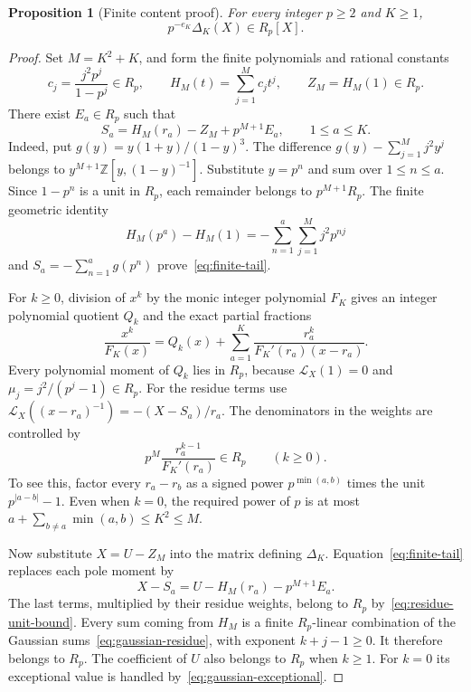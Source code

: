 \documentclass[11pt,letterpaper]{article}
\numberwithin{equation}{section}
\newtheorem{proposition}[theorem]{Proposition}
\theoremstyle{remark}
\newcommand{\Z}{\mathbb Z}
\newcommand{\Lcal}{\mathcal L}
\begin{document}
\begin{proposition}[Finite content proof]\label{prop:elementary-content}
For every integer $p\ge2$ and $K\ge1$,
\begin{equation*}
 p^{-e_K}\Delta_K(X)\in R_p[X].
\end{equation*}
\end{proposition}
\begin{proof}
Set $M=K^2+K$, and form the finite polynomials and rational constants
\begin{equation*}
 c_j=\frac{j^2p^j}{1-p^j}\in R_p,\qquad
 H_M(t)=\sum_{j=1}^{M}c_jt^j,\qquad Z_M=H_M(1)\in R_p.
\end{equation*}
There exist $E_a\in R_p$ such that
\begin{equation}\label{eq:finite-tail}
 S_a=H_M(r_a)-Z_M+p^{M+1}E_a,\qquad 1\le a\le K.
\end{equation}
Indeed, put $g(y)=y(1+y)/(1-y)^3$. The difference
$g(y)-\sum_{j=1}^{M}j^2y^j$ belongs to
$y^{M+1}\Z[y,(1-y)^{-1}]$. Substitute $y=p^n$ and sum over $1\le n\le a$. Since $1-p^n$ is a unit in $R_p$, each remainder belongs to $p^{M+1}R_p$. The finite geometric identity
\begin{equation*}
 H_M(p^a)-H_M(1)
 =-\sum_{n=1}^a\sum_{j=1}^{M}j^2p^{nj}
\end{equation*}
and $S_a=-\sum_{n=1}^a g(p^n)$ prove~\eqref{eq:finite-tail}.

For $k\ge0$, division of $x^k$ by the monic integer polynomial $F_K$ gives an integer polynomial quotient $Q_k$ and the exact partial fractions
\begin{equation*}
 \frac{x^k}{F_K(x)}=Q_k(x)+
 \sum_{a=1}^K\frac{r_a^k}{F_K'(r_a)(x-r_a)}.
\end{equation*}
Every polynomial moment of $Q_k$ lies in $R_p$, because $\Lcal_X(1)=0$ and $\mu_j=j^2/(p^j-1)\in R_p$. For the residue terms use $\Lcal_X((x-r_a)^{-1})=-(X-S_a)/r_a$. The denominators in the weights are controlled by
\begin{equation}\label{eq:residue-unit-bound}
 p^M\frac{r_a^{k-1}}{F_K'(r_a)}\in R_p\qquad(k\ge0).
\end{equation}
To see this, factor every $r_a-r_b$ as a signed power $p^{\min(a,b)}$ times the unit $p^{|a-b|}-1$. Even when $k=0$, the required power of $p$ is at most
$a+\sum_{b\ne a}\min(a,b)\le K^2\le M$.

Now substitute $X=U-Z_M$ into the matrix defining $\Delta_K$. Equation~\eqref{eq:finite-tail} replaces each pole moment by
\begin{equation*}
 X-S_a=U-H_M(r_a)-p^{M+1}E_a.
\end{equation*}
The last terms, multiplied by their residue weights, belong to $R_p$ by~\eqref{eq:residue-unit-bound}. Every sum coming from $H_M$ is a finite $R_p$-linear combination of the Gaussian sums~\eqref{eq:gaussian-residue}, with exponent $k+j-1\ge0$. It therefore belongs to $R_p$. The coefficient of $U$ also belongs to $R_p$ when $k\ge1$. For $k=0$ its exceptional value is handled by~\eqref{eq:gaussian-exceptional}.


\end{proof}
\end{document}
